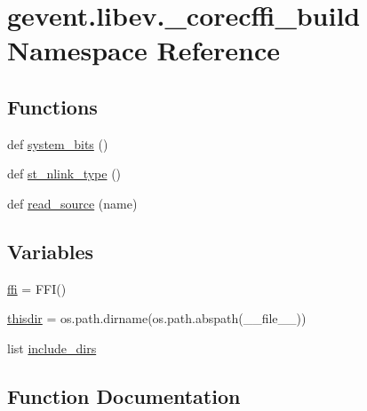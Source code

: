 \hypertarget{namespacegevent_1_1libev_1_1__corecffi__build}{}\section{gevent.\+libev.\+\_\+corecffi\+\_\+build Namespace Reference}
\label{namespacegevent_1_1libev_1_1__corecffi__build}
\subsection*{Functions}
\begin{DoxyCompactItemize}
\item 
def \hyperlink{namespacegevent_1_1libev_1_1__corecffi__build_afdf3f97b8e735802e9047b8d65a4a1d0}{system\+\_\+bits} ()
\item 
def \hyperlink{namespacegevent_1_1libev_1_1__corecffi__build_a31810dece167764040c8c2c97bd1763e}{st\+\_\+nlink\+\_\+type} ()
\item 
def \hyperlink{namespacegevent_1_1libev_1_1__corecffi__build_a01b2e8da7980d678c2272c61e511e374}{read\+\_\+source} (name)
\end{DoxyCompactItemize}
\subsection*{Variables}
\begin{DoxyCompactItemize}
\item 
\hyperlink{namespacegevent_1_1libev_1_1__corecffi__build_a3b4a19b9ea5824f7f9b39847ea88e3fd}{ffi} = F\+FI()
\item 
\hyperlink{namespacegevent_1_1libev_1_1__corecffi__build_a0227fdb82b0e400febc41f9171536258}{thisdir} = os.\+path.\+dirname(os.\+path.\+abspath(\+\_\+\+\_\+file\+\_\+\+\_\+))
\item 
list \hyperlink{namespacegevent_1_1libev_1_1__corecffi__build_a936bfbc8b93b158dc083a1726cf5fd9d}{include\+\_\+dirs}
\end{DoxyCompactItemize}


\subsection{Function Documentation}
\mbox{\label{namespacegevent_1_1libev_1_1__corecffi__build_a01b2e8da7980d678c2272c61e511e374}} 
